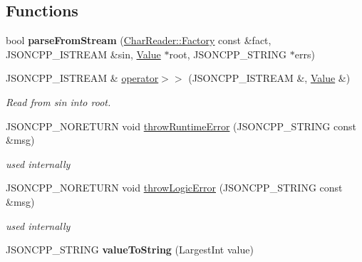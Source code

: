 \subsection*{Functions}
\begin{DoxyCompactItemize}
\item 
bool {\bfseries parse\+From\+Stream} (\hyperlink{class_json_1_1_char_reader_1_1_factory}{Char\+Reader\+::\+Factory} const \&fact, J\+S\+O\+N\+C\+P\+P\+\_\+\+I\+S\+T\+R\+E\+AM \&sin, \hyperlink{class_json_1_1_value}{Value} $\ast$root, J\+S\+O\+N\+C\+P\+P\+\_\+\+S\+T\+R\+I\+NG $\ast$errs)\hypertarget{namespace_json_a38f903cfdb57a6c4e86a7dcc42f3712c}{}\label{namespace_json_a38f903cfdb57a6c4e86a7dcc42f3712c}

\item 
J\+S\+O\+N\+C\+P\+P\+\_\+\+I\+S\+T\+R\+E\+AM \& \hyperlink{namespace_json_a01f08004efa8a401e01ebd17be77dc71}{operator$>$$>$} (J\+S\+O\+N\+C\+P\+P\+\_\+\+I\+S\+T\+R\+E\+AM \&, \hyperlink{class_json_1_1_value}{Value} \&)
\begin{DoxyCompactList}\small\item\em Read from \textquotesingle{}sin\textquotesingle{} into \textquotesingle{}root\textquotesingle{}. \end{DoxyCompactList}\item 
J\+S\+O\+N\+C\+P\+P\+\_\+\+N\+O\+R\+E\+T\+U\+RN void \hyperlink{namespace_json_a0ab7ff7f99788262d92d9ff3d924e065}{throw\+Runtime\+Error} (J\+S\+O\+N\+C\+P\+P\+\_\+\+S\+T\+R\+I\+NG const \&msg)\hypertarget{namespace_json_a0ab7ff7f99788262d92d9ff3d924e065}{}\label{namespace_json_a0ab7ff7f99788262d92d9ff3d924e065}

\begin{DoxyCompactList}\small\item\em used internally \end{DoxyCompactList}\item 
J\+S\+O\+N\+C\+P\+P\+\_\+\+N\+O\+R\+E\+T\+U\+RN void \hyperlink{namespace_json_a27790f21f17922fac81e7cd72a5659a5}{throw\+Logic\+Error} (J\+S\+O\+N\+C\+P\+P\+\_\+\+S\+T\+R\+I\+NG const \&msg)\hypertarget{namespace_json_a27790f21f17922fac81e7cd72a5659a5}{}\label{namespace_json_a27790f21f17922fac81e7cd72a5659a5}

\begin{DoxyCompactList}\small\item\em used internally \end{DoxyCompactList}\item 
J\+S\+O\+N\+C\+P\+P\+\_\+\+S\+T\+R\+I\+NG {\bfseries value\+To\+String} (Largest\+Int value)\hypertarget{namespace_json_a77501ed00903d1b183a55a5fbf6b749a}{}\label{namespace_json_a77501ed00903d1b183a55a5fbf6b749a}


\end{DoxyCompactItemize}
